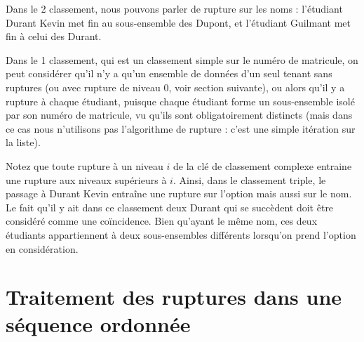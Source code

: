 	
	Dans le 2\ieme{} classement, nous pouvons parler de
	rupture sur les noms : l’étudiant Durant Kevin met fin au sous-ensemble
	des Dupont, et l’étudiant Guilmant met fin à celui des Durant.
		
	Dans le 1\ier{} classement, qui est un classement simple
	sur le numéro de matricule, on peut considérer qu’il n’y a qu’un
	ensemble de données d’un seul tenant sans ruptures (ou avec rupture de niveau 0, voir section suivante), ou alors qu’il y a
	rupture à chaque étudiant, puisque chaque étudiant forme un
	sous-ensemble isolé par son numéro de matricule, vu qu’ils sont
	obligatoirement distincts (mais dans ce cas nous n'utilisons pas 
        l'algorithme de rupture : c'est une simple itération sur la liste).
	
	Notez que toute rupture à un niveau $i$ de la clé de classement complexe
	entraine une rupture aux niveaux supérieurs à $i$. Ainsi, dans le
	classement triple, le passage à Durant Kevin entraîne une rupture sur
	l’option mais aussi sur le nom. Le fait qu’il y ait dans ce classement
	deux Durant qui se succèdent doit être considéré comme une coïncidence.
	Bien qu’ayant le même nom, ces deux étudiants appartiennent à deux
	sous-ensembles différents lorsqu’on prend l’option en considération.
	


\section{Traitement des ruptures dans une séquence ordonnée}

